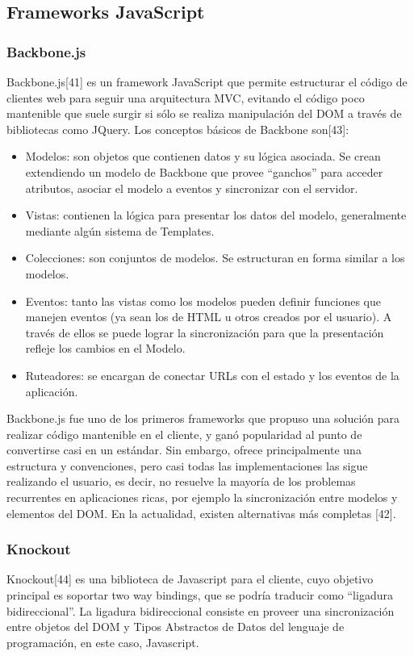 \documentclass[doc,helv,longtable]{article}
\begin{document}
\subsection{Frameworks JavaScript}
\subsubsection{Backbone.js}
Backbone.js[41] es un framework JavaScript que permite estructurar el código de clientes web para seguir una arquitectura MVC, evitando el código poco mantenible que suele surgir si sólo se realiza manipulación del DOM a través de bibliotecas como JQuery. Los conceptos básicos de Backbone son[43]:
\begin{itemize}
\item  Modelos: son objetos que contienen datos y su lógica asociada. Se crean extendiendo un modelo de Backbone que provee “ganchos” para acceder atributos, asociar el modelo a eventos y sincronizar con el servidor.
\item  Vistas: contienen la lógica para presentar los datos del modelo, generalmente mediante algún sistema de Templates.
\item  Colecciones: son conjuntos de modelos. Se estructuran en forma similar a los modelos.
\item  Eventos: tanto las vistas como los modelos pueden definir funciones que manejen eventos (ya sean los de HTML u otros creados por el usuario). A través de ellos se puede lograr la sincronización para que la presentación refleje los cambios en el Modelo.
\item  Ruteadores: se encargan de conectar URLs con el estado y los eventos de la aplicación.

\end{itemize}


Backbone.js fue uno de los primeros frameworks que propuso una solución para realizar código mantenible en el cliente, y ganó popularidad al punto de convertirse casi en un estándar. Sin embargo, ofrece principalmente una estructura y convenciones, pero casi todas las implementaciones las sigue realizando el usuario, es decir, no resuelve la mayoría de los problemas recurrentes en aplicaciones ricas, por ejemplo la sincronización entre modelos y elementos del DOM. En la actualidad, existen alternativas más completas [42].

\subsubsection{Knockout}
Knockout[44] es una biblioteca de Javascript para el cliente, cuyo objetivo principal es soportar two way bindings, que se podría traducir como “ligadura bidireccional”. La ligadura bidireccional consiste en proveer una sincronización entre objetos del DOM y Tipos Abstractos de Datos del lenguaje de programación, en este caso, Javascript. 
\end{document}
